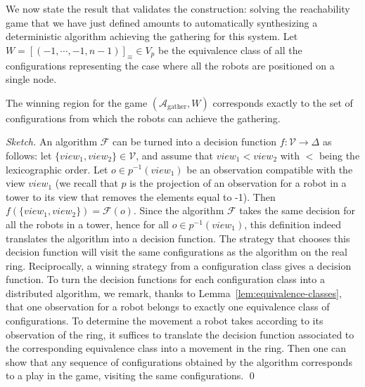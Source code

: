 \documentclass[envcountsame]{llncs} \usepackage[english]{babel}
\newcommand{\arena}{\ensuremath{\mathcal{A}}}
\newcommand{\Views}{\ensuremath{\mathcal{V}}}
\newcommand{\equivclass}[1]{[#1]_\equiv}
\newcommand{\Agather}{\ensuremath{\arena_{\textrm{gather}}}}
\newcommand{\Actions}{\ensuremath{\Delta}}
\begin{document}
We now state the result that validates the construction: solving the reachability game that we have just defined
amounts to automatically synthesizing a deterministic algorithm achieving the gathering for this system.
Let $W=\equivclass{(-1,\cdots,-1, n-1)}\in V_p$ be the equivalence class of all the configurations representing the case where all the robots
are positioned on a single node.
\begin{theorem}\label{th:correctness}
The winning region for the game $(\Agather, W)$ corresponds exactly to the set of 
configurations from which the robots can achieve the gathering.
\end{theorem}

\begin{proof}[Sketch]
An algorithm $\mathcal{F}$ can be turned into a decision function $f:\Views\rightarrow \Actions$ as follows: let $\{\mathit{view}_1,\mathit{view_2}\}\in\Views$, and assume that $\mathit{view}_1<\mathit{view}_2$ with $<$ being the lexicographic order. Let $o\in p^{-1}(\mathit{view}_1)$ be an observation compatible
with the view $\mathit{view}_1$ (we recall that $p$ is the projection of an observation for a robot in a tower to its view that removes the
elements equal to -1). Then $f(\{\mathit{view}_1,\mathit{view}_2\})=\mathcal{F}(o)$. Since the algorithm $\mathcal{F}$ takes the same decision for all the robots in a 
tower, hence for all $o\in p^{-1}(\mathit{view}_1)$, this definition indeed translates the algorithm into a decision function. The strategy that chooses this decision 
function will visit the same configurations as the algorithm on the real ring. Reciprocally, a winning strategy from a configuration class gives a decision function. To 
turn the decision functions for each configuration class into a distributed algorithm, we remark, thanks to Lemma~\ref{lem:equivalence-classes}, that one 
observation for a robot belongs to exactly one equivalence class of configurations. To determine the movement a robot takes according to its observation of the 
ring, it suffices to translate the decision function associated to the corresponding equivalence class into a movement in the ring. Then one can show that any 
sequence of configurations obtained by the algorithm corresponds to a play in the game, visiting the same configurations.
\qed\end{proof}
\end{document}
